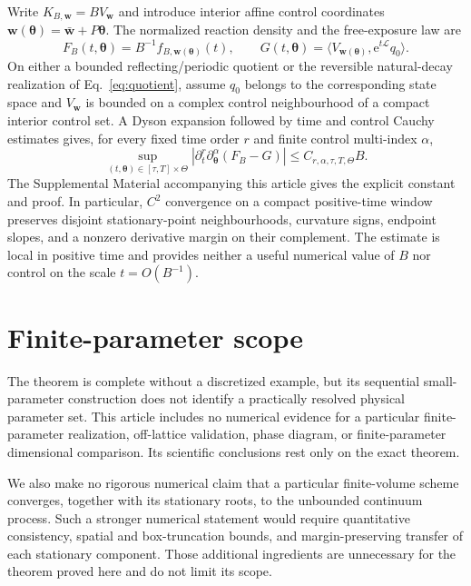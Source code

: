 \documentclass[aps,physrev,reprint,amsmath,amssymb,longbibliography,floatfix]{revtex4-2}
\newcommand{\e}{\mathrm e}
\begin{document}
Write \(K_{B,\bm w}=BV_{\bm w}\) and introduce interior affine control
coordinates \(\bm w(\bm\theta)=\bar{\bm w}+P\bm\theta\).  The normalized
reaction density and the free-exposure law are
\begin{equation}
 F_B(t,\bm\theta)=B^{-1}f_{B,\bm w(\bm\theta)}(t),
 \qquad
 G(t,\bm\theta)=
 \langle V_{\bm w(\bm\theta)},\e^{t\mathcal L}q_0\rangle.
 \label{eq:normalized-exposure}
\end{equation}
On either a bounded reflecting/periodic quotient or the reversible
natural-decay realization of Eq.~\eqref{eq:quotient}, assume \(q_0\) belongs
to the corresponding state space and \(V_{\bm w}\) is bounded on a complex
control neighbourhood of a compact interior control set.  A
Dyson expansion followed by time and control Cauchy estimates gives, for
every fixed time order \(r\) and finite control multi-index \(\alpha\),
\begin{equation}
 \sup_{(t,\bm\theta)\in[\tau,T]\times\Theta}
 \left|
 \partial_t^r\partial_{\bm\theta}^{\alpha}(F_B-G)
 \right|
 \le C_{r,\alpha,\tau,T,\Theta}B.
 \label{eq:mixed-jet}
\end{equation}
The Supplemental Material accompanying this article
\cite{supplementalMaterial} gives the explicit constant and proof.  In
particular, \(C^2\) convergence on a compact positive-time window preserves
disjoint stationary-point neighbourhoods, curvature signs, endpoint slopes,
and a nonzero derivative margin on their complement.  The estimate is local
in positive time and provides neither a useful numerical value of \(B\) nor
control on the scale \(t=O(B^{-1})\).



\section{Finite-parameter scope}
\label{sec:finite-scope}

The theorem is complete without a discretized example, but its sequential
small-parameter construction does not identify a practically resolved
physical parameter set.  This article includes no numerical evidence for a
particular finite-parameter realization, off-lattice validation, phase
diagram, or finite-parameter dimensional comparison.  Its scientific
conclusions rest only on the exact theorem.

We also make no rigorous numerical claim that a particular finite-volume
scheme converges, together with its stationary roots, to the unbounded
continuum process.  Such a stronger numerical statement would require
quantitative consistency, spatial and box-truncation bounds, and
margin-preserving transfer of each stationary component.  Those additional
ingredients are unnecessary for the theorem proved here and do not limit its
scope.
\end{document}
